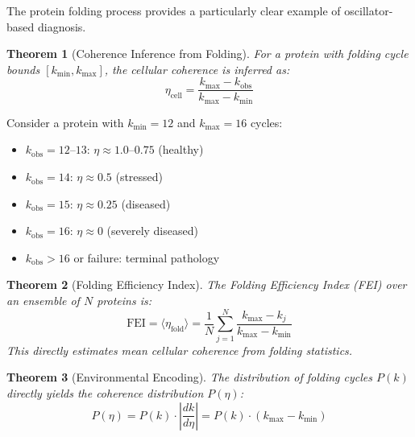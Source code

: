\documentclass[aps,prd,twocolumn,superscriptaddress,floatfix,nofootinbib]{revtex4-2}
\newtheorem{theorem}{Theorem}[section]
\theoremstyle{remark}
\begin{document}
The protein folding process provides a particularly clear example of oscillator-based diagnosis.

\begin{theorem}[Coherence Inference from Folding]
\label{thm:coherence_from_folding}
For a protein with folding cycle bounds $[k_{\min}, k_{\max}]$, the cellular coherence is inferred as:
\begin{equation}
\eta_{\mathrm{cell}} = \frac{k_{\max} - k_{\mathrm{obs}}}{k_{\max} - k_{\min}}
\end{equation}
\end{theorem}

\begin{example}
Consider a protein with $k_{\min} = 12$ and $k_{\max} = 16$ cycles:
\begin{itemize}
\item $k_{\mathrm{obs}} = 12$--$13$: $\eta \approx 1.0$--$0.75$ (healthy)
\item $k_{\mathrm{obs}} = 14$: $\eta \approx 0.5$ (stressed)
\item $k_{\mathrm{obs}} = 15$: $\eta \approx 0.25$ (diseased)
\item $k_{\mathrm{obs}} = 16$: $\eta \approx 0$ (severely diseased)
\item $k_{\mathrm{obs}} > 16$ or failure: terminal pathology
\end{itemize}
\end{example}

\begin{theorem}[Folding Efficiency Index]
\label{thm:fei}
The Folding Efficiency Index (FEI) over an ensemble of $N$ proteins is:
\begin{equation}
\mathrm{FEI} = \langle\eta_{\mathrm{fold}}\rangle = \frac{1}{N}\sum_{j=1}^{N} \frac{k_{\max} - k_j}{k_{\max} - k_{\min}}
\end{equation}
This directly estimates mean cellular coherence from folding statistics.
\end{theorem}

\begin{theorem}[Environmental Encoding]
\label{thm:environmental_encoding}
The distribution of folding cycles $P(k)$ directly yields the coherence distribution $P(\eta)$:
\begin{equation}
P(\eta) = P(k) \cdot \left|\frac{dk}{d\eta}\right| = P(k) \cdot (k_{\max} - k_{\min})
\end{equation}
\end{theorem}
\end{document}
